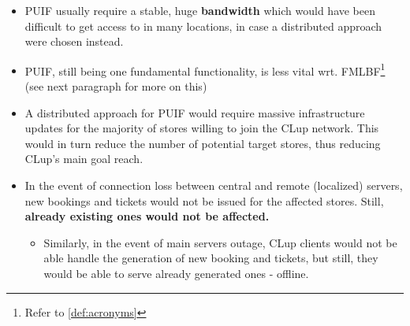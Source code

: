 \begin{itemize}
    \item PUIF usually require a stable, huge \textbf{bandwidth} which would have been difficult to get access to in many locations, in case a distributed approach were chosen instead.
    \item PUIF, still being one fundamental functionality, is less vital wrt. FMLBF\footnote{Refer to \ref{def:acronyms}} (see next paragraph for more on this)
    \item A distributed approach for PUIF would require massive infrastructure updates for the majority of stores willing to join the CLup network. This would in turn reduce the number of potential target stores, thus reducing CLup's main goal reach.
    \item In the event of connection loss between central and remote (localized) servers, new bookings and tickets would not be issued for the affected stores. Still, \textbf{already existing ones would not be affected.}
    \begin{itemize}
        \item Similarly, in the event of main servers outage, CLup clients would not be able handle the generation of new booking and tickets, but still, they would be able to serve already generated ones - offline.
    \end{itemize}
\end{itemize}

